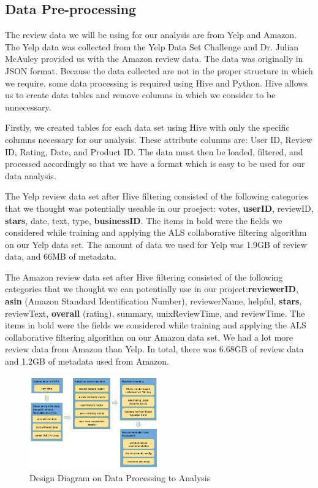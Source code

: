 \documentclass[conference]{IEEEtran}
\begin{document}
\subsection{Data Pre-processing}

The review data we will be using for our analysis are from Yelp and Amazon.  The Yelp data was collected from the Yelp Data Set Challenge and Dr. Julian McAuley provided us with the Amazon review data.  The data was originally in JSON format.  Because the data collected are not in the proper structure in which we require, some data processing is required using Hive and Python.  Hive allows us to create data tables and remove columns in which we consider to be unnecessary.

Firstly, we created tables for each data set using Hive with only the specific columns necessary for our analysis. These  attribute columns are: User ID, Review ID, Rating, Date, and Product ID. The data must then be loaded, filtered, and processed accordingly so that we have a format which is easy to be used for our data analysis.

The Yelp review data set after Hive filtering consisted of the following categories that we thought was potentially useable in our proeject: votes, \textbf{userID}, reviewID, \textbf{stars}, date, text, type, \textbf{businessID}.  The items in bold were the fields we considered while training and applying the ALS collaborative filtering algorithm on our Yelp data set.  The amount of data we used for Yelp was 1.9GB of review data, and 66MB of metadata.

The Amazon review data set after Hive filtering consisted of the following categories that we thought we can potentially use in our project:\textbf{reviewerID}, \textbf{asin} (Amazon Standard Identification Number), reviewerName, helpful, \textbf{stars}, reviewText, \textbf{overall} (rating), summary, unixReviewTime, and reviewTime.  The items in bold were the fields we considered while training and applying the ALS collaborative filtering algorithm on our Amazon data set.  We had a lot more review data from Amazon than Yelp.  In total, there was 6.68GB of review data and 1.2GB of metadata used from Amazon.

\begin{figure}[h]
\centering
\includegraphics[width=0.5\textwidth]{image/design_v2}
\caption{Design Diagram on Data Processing to Analysis}
\end{figure}
\end{document}
